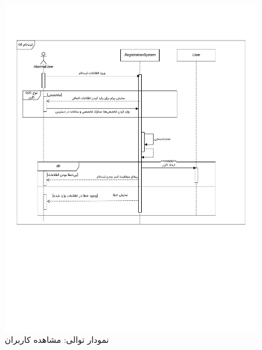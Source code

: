 \begin{figure}
	\centering
	\includegraphics[scale=0.8, page=5]{figs/OOD-Sequence-1.pdf}
	\caption{نمودار توالی: مشاهده کاربران}
\end{figure}
\FloatBarrier
\newpage

